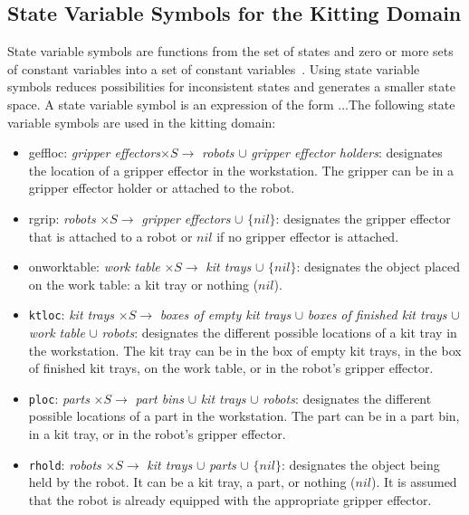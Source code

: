 \subsection{State Variable Symbols for the Kitting Domain}
State variable symbols are functions from the set of states and zero or more sets of constant variables into a set of constant variables~\cite{NAU.2004}. Using state variable symbols reduces possibilities for inconsistent states and generates a smaller state space. A state variable symbol is an expression of the form ...The following state variable symbols are used in the kitting domain:
\begin{itemize}
\item geffloc: \emph{gripper effectors}$\times S \rightarrow$ \emph{robots} $\cup$ \emph{gripper effector holders}: designates the location of a gripper effector in the workstation. The gripper can be in a gripper effector holder or attached to the robot.


\item rgrip: \emph{robots} $\times S \rightarrow$ \emph{gripper effectors} $\cup$ $\lbrace nil\rbrace$: designates the gripper effector that is attached to a robot or $nil$ if no gripper effector is attached.

\item onworktable: \emph{work table} $\times S \rightarrow$ \emph{kit trays} $\cup$ $\lbrace nil\rbrace$: designates the object placed on the work table: a kit tray or nothing ($nil$).

\item \texttt{ktloc}: \emph{kit trays} $\times S \rightarrow$ \emph{boxes of empty kit trays} $\cup$ \emph{boxes of finished kit trays} $\cup$ \emph{work table} $\cup$ \emph{robots}: designates the different possible locations of a kit tray in the workstation. The kit tray can be in the box of empty kit trays, in the box of finished kit trays, on the work table, or in the robot's gripper effector.

\item \texttt{ploc}: \emph{parts} $\times S \rightarrow$ \emph{part bins} $\cup$ \emph{kit trays} $\cup$ \emph{robots}: designates the different possible locations of a part in the workstation. The part can be in a part bin, in a kit tray, or in the robot's gripper effector.

\item \texttt{rhold}: \textit{robots} $\times S \rightarrow$ \textit{kit trays} $\cup$ \textit{parts} $\cup$ $\lbrace nil\rbrace$: designates the object being held by the robot. It can be a kit tray, a part, or nothing ($nil$). It is assumed that the robot is already equipped with the appropriate gripper effector.


\end{itemize}
